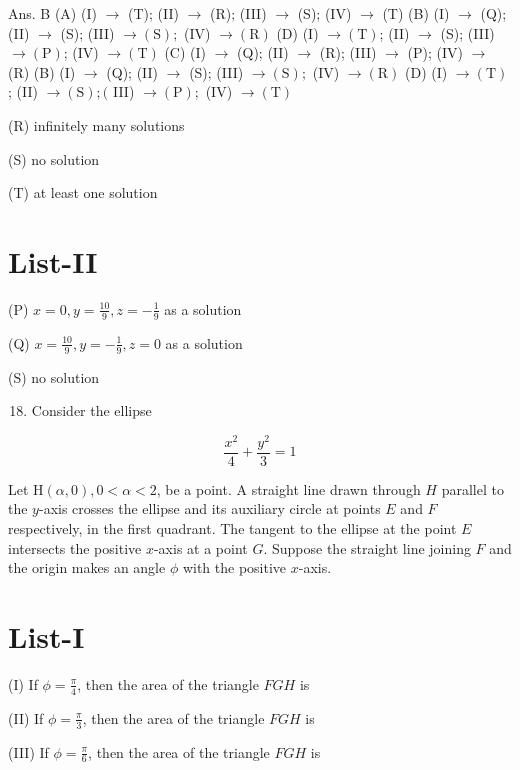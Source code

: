 \documentclass[10pt]{article}
\begin{document}
Ans. B
(A) (I) $\rightarrow$ (T); (II) $\rightarrow$ (R); (III) $\rightarrow$ (S); (IV) $\rightarrow$ (T)
(B) (I) $\rightarrow$ (Q); (II) $\rightarrow$ (S); (III) $\rightarrow(\mathrm{S}) ;$ (IV) $\rightarrow(\mathrm{R})$
(D) (I) $\rightarrow(\mathrm{T})$; (II) $\rightarrow$ (S); (III) $\rightarrow(\mathrm{P})$; (IV) $\rightarrow(\mathrm{T})$
(C) (I) $\rightarrow$ (Q); (II) $\rightarrow$ (R); (III) $\rightarrow$ (P); (IV) $\rightarrow$ (R)
(B) (I) $\rightarrow$ (Q); (II) $\rightarrow$ (S); (III) $\rightarrow(\mathrm{S}) ;$ (IV) $\rightarrow(\mathrm{R})$
(D) (I) $\rightarrow(\mathrm{T})$; (II) $\rightarrow(\mathrm{S}) ;($ III) $\rightarrow(\mathrm{P}) ;$ (IV) $\rightarrow(\mathrm{T})$

(R) infinitely many solutions

(S) no solution

(T) at least one solution

\section{List-II}
(P) $x=0, y=\frac{10}{9}, z=-\frac{1}{9}$ as a solution

(Q) $x=\frac{10}{9}, y=-\frac{1}{9}, z=0$ as a solution

(S) no solution

\begin{enumerate}
  \setcounter{enumi}{17}
  \item Consider the ellipse
\end{enumerate}

$$
\frac{x^{2}}{4}+\frac{y^{2}}{3}=1
$$

Let $\mathrm{H}(\alpha, 0), 0<\alpha<2$, be a point. A straight line drawn through $H$ parallel to the $y$-axis crosses the ellipse and its auxiliary circle at points $E$ and $F$ respectively, in the first quadrant. The tangent to the ellipse at the point $E$ intersects the positive $x$-axis at a point $G$. Suppose the straight line joining $F$ and the origin makes an angle $\phi$ with the positive $x$-axis.

\section{List-I}
(I) If $\phi=\frac{\pi}{4}$, then the area of the triangle $F G H$ is

(II) If $\phi=\frac{\pi}{3}$, then the area of the triangle $F G H$ is

(III) If $\phi=\frac{\pi}{6}$, then the area of the triangle $F G H$ is
\end{document}
